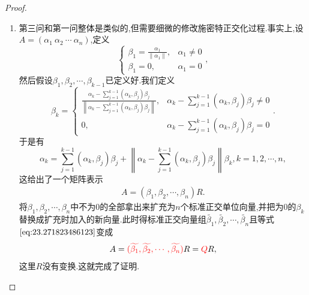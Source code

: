 \documentclass[../../main.tex]{subfiles}%
\begin{document}
\begin{proof}
\begin{enumerate}
\item 第三问和第一问整体是类似的,但需要细微的修改施密特正交化过程.事实上,设\( A = (\alpha_1\ \alpha_2\ \cdots\ \alpha_n) \),定义
\[
\begin{cases}
\beta_1 = \frac{\alpha_1}{\|\alpha_1\|}, & \alpha_1 \neq 0 \\
\beta_1 = 0, & \alpha_1 = 0
\end{cases},
\]
然后假设\( \beta_1, \beta_2, \cdots, \beta_{k - 1} \)已定义好.我们定义
\[
\beta_k = \begin{cases}
\frac{\alpha_k - \sum\limits_{j=1}^{k - 1} (\alpha_k, \beta_j) \beta_j}{\left\| \alpha_k - \sum\limits_{j=1}^{k - 1} (\alpha_k, \beta_j) \beta_j \right\|}, & \alpha_k - \sum_{j=1}^{k - 1} (\alpha_k, \beta_j) \beta_j \neq 0 \\
0, & \alpha_k - \sum_{j=1}^{k - 1} (\alpha_k, \beta_j) \beta_j = 0
\end{cases}.
\]
于是有
\[
\alpha_k = \sum_{j=1}^{k - 1} (\alpha_k, \beta_j) \beta_j + \left\| \alpha_k - \sum_{j=1}^{k - 1} (\alpha_k, \beta_j) \beta_j \right\| \beta_k, k = 1, 2, \cdots, n,
\]
这给出了一个矩阵表示
\begin{align}
A = (\beta_1, \beta_2, \cdots, \beta_n) R. \label{eq:23.271823486123}
\end{align}
将\( \beta_1, \beta_2, \cdots, \beta_n \)中不为0的全部拿出来扩充为\( n \)个标准正交单位向量,并把为0的\( \beta_k \)替换成扩充时加入的新向量.此时得标准正交向量组\( \widetilde{\beta_1}, \widetilde{\beta_2}, \cdots, \widetilde{\beta_n} \)且等式\(\eqref{eq:23.271823486123}\)变成
\[
A = {\color{red} (\widetilde{\beta_1}, \widetilde{\beta_2}, \cdots, \widetilde{\beta_n})} R = {\color{red} Q}R,
\]
这里\( R \)没有变换.这就完成了证明.
\end{enumerate}
\end{proof}
\end{document}
